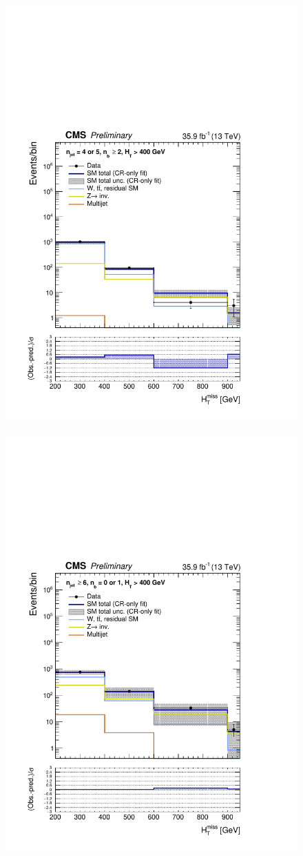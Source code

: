 \begin{figure}[h!]
  \includegraphics[width=0.8\linewidth]{figures/results/36invfb/aggregated/postFitShapeCR/mhtShape_ge2b_eq45j_400_Inf_crfit.pdf} ~
  \includegraphics[width=0.8\linewidth]{figures/results/36invfb/aggregated/postFitShapeCR/mhtShape_eq01b_ge6j_400_Inf_crfit.pdf} ~

\end{figure}
